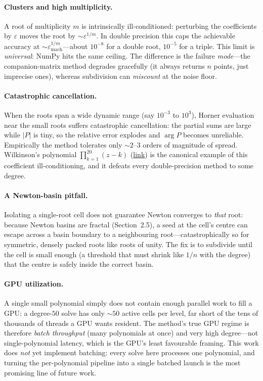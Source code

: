 \documentclass[11pt]{article}
\begin{document}
\paragraph{Clusters and high multiplicity.} A root of multiplicity $m$ is
intrinsically ill-conditioned: perturbing the coefficients by $\varepsilon$ moves
the root by ${\sim}\varepsilon^{1/m}$. In double precision this caps the
achievable accuracy at ${\sim}\varepsilon_{\text{mach}}^{1/m}$---about
$10^{-8}$ for a double root, $10^{-5}$ for a triple. This limit is
\emph{universal}: NumPy hits the same ceiling. The difference is the failure
\emph{mode}---the companion-matrix method degrades gracefully (it always returns
$n$ points, just imprecise ones), whereas subdivision can \emph{miscount} at the
noise floor.

\paragraph{Catastrophic cancellation.} When the roots span a wide dynamic range
(say $10^{-3}$ to $10^{3}$), Horner evaluation near the small roots suffers
catastrophic cancellation: the partial sums are large while $|P|$ is tiny, so the
relative error explodes and $\arg P$ becomes unreliable. Empirically the method
tolerates only ${\sim}2$--$3$ orders of magnitude of spread. Wilkinson's
polynomial $\prod_{k=1}^{20}(z-k)$
(\href{https://en.wikipedia.org/wiki/Wilkinson\%27s_polynomial}{link}) is the
canonical example of this coefficient ill-conditioning, and it defeats every
double-precision method to some degree.

\paragraph{A Newton-basin pitfall.} Isolating a single-root cell does not
guarantee Newton converges to \emph{that} root: because Newton basins are
fractal (Section~2.5), a seed at the cell's centre can escape across a basin
boundary to a neighbouring root---catastrophically so for symmetric, densely
packed roots like roots of unity. The fix is to subdivide until the cell is small
enough (a threshold that must shrink like $1/n$ with the degree) that the centre
is safely inside the correct basin.

\paragraph{GPU utilization.} A single small polynomial simply does not contain
enough parallel work to fill a GPU: a degree-$50$ solve has only ${\sim}50$
active cells per level, far short of the tens of thousands of threads a GPU wants
resident. The method's true GPU regime is therefore \emph{batch throughput}
(many polynomials at once) and very high degree---not single-polynomial latency,
which is the GPU's least favourable framing. This work does \emph{not} yet
implement batching: every solve here processes one polynomial, and turning the
per-polynomial pipeline into a single batched launch is the most promising line
of future work.
\end{document}
